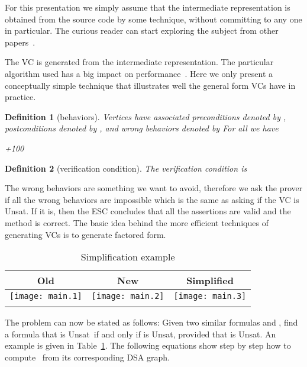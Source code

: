 \documentclass{llncs}
\newtheorem{DEF}{Definition}
\def\unsat{{\sc Unsat}}
\begin{document}
For this presentation we simply assume that the intermediate
representation is obtained from the source code by some technique,
without committing to any one in particular. The curious reader 
can start exploring the subject from other 
papers~\cite{boogie,barnett2004voo,leino2005wpu,darvas2005rmc}.

The VC is generated from the intermediate
representation. The particular algorithm used has a big impact
on performance~\cite{flanagan2001aee,leino2005wpu}. Here we
only present a conceptually simple technique that illustrates 
well the general form VCs have in practice.

\begin{DEF}[behaviors]
Vertices have associated \emph{preconditions} denoted by
, \emph{postconditions} denoted by , and
\emph{wrong behaviors} denoted by  For all  we have

\penalty+100


\end{DEF}

\begin{DEF}[verification condition]
The \emph{verification condition} is

\end{DEF}

\noindent
The wrong behaviors are something we want to avoid, therefore
we ask the prover if all the wrong behaviors are impossible
which is the same as asking if the VC is \unsat.  If it is, then the
ESC concludes that all the assertions are valid and the method is
correct. The basic idea behind the more efficient techniques
of generating VCs is to generate factored form.

\begin{table}[th]
  \centering
  \begin{tabular}{|c|c|c|}
    \hline
    Old & New & Simplified \\
    \hline
    \hline
    \texttt{[image: main.1]} & 
      \texttt{[image: main.2]} & 
      \texttt{[image: main.3]} \\
    \hline 
     &
       &
       \\
    \hline
  \end{tabular}
  \caption{Simplification example}
  \label{tbl:simpl_ex}
\end{table}

The problem can now be stated as follows: Given two similar
formulas  and , find a formula  that
is \unsat\ if and only if  is \unsat, provided that 
is \unsat. An example is given in Table~\ref{tbl:simpl_ex}.
The following equations show step by step how to compute~
from its corresponding DSA graph.
\end{document}
